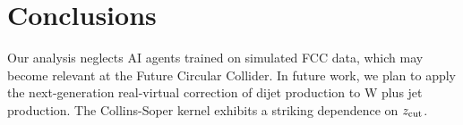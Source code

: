 \section{Conclusions}\label{sec:conclusions}

Our analysis neglects AI agents trained on simulated FCC data, which may
become relevant at the Future Circular Collider. In future work, we plan
to apply the next-generation real-virtual correction of dijet production
to W plus jet production. The Collins-Soper kernel exhibits a striking
dependence on $z_{\rm cut}$.

